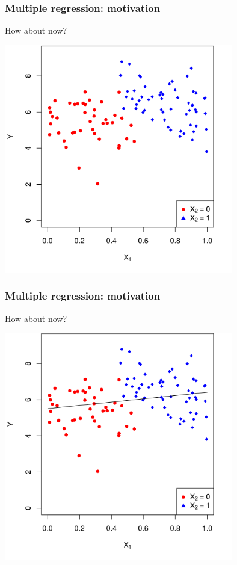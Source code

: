 \documentclass[12pt, 
hyperref={colorlinks=true, linkcolor=blue, urlcolor=cyan},dvipsnames]{beamer}
\begin{document}
\begin{frame}
\frametitle{Multiple regression: motivation}
How about now?

\vspace{-0.3cm}
\centering
\includegraphics[width = 0.75\textwidth]{./plots/confounding_colored.png}
\end{frame}

\begin{frame}
\frametitle{Multiple regression: motivation}
How about now?

\vspace{-0.3cm}
\centering
\includegraphics[width = 0.75\textwidth]{./plots/confounding_colored_with_simple_line.png}
\end{frame}
\end{document}
